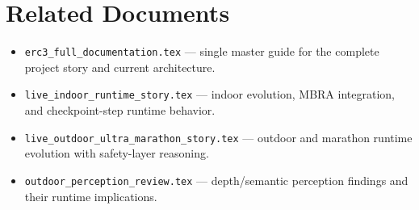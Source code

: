 \documentclass[11pt,a4paper]{article}
\begin{document}
\section{Related Documents}
\begin{itemize}
  \item \texttt{erc3\_full\_documentation.tex} --- single master guide for the complete project story and current architecture.
  \item \texttt{live\_indoor\_runtime\_story.tex} --- indoor evolution, MBRA integration, and checkpoint-step runtime behavior.
  \item \texttt{live\_outdoor\_ultra\_marathon\_story.tex} --- outdoor and marathon runtime evolution with safety-layer reasoning.
  \item \texttt{outdoor\_perception\_review.tex} --- depth/semantic perception findings and their runtime implications.
\end{itemize}
\end{document}
